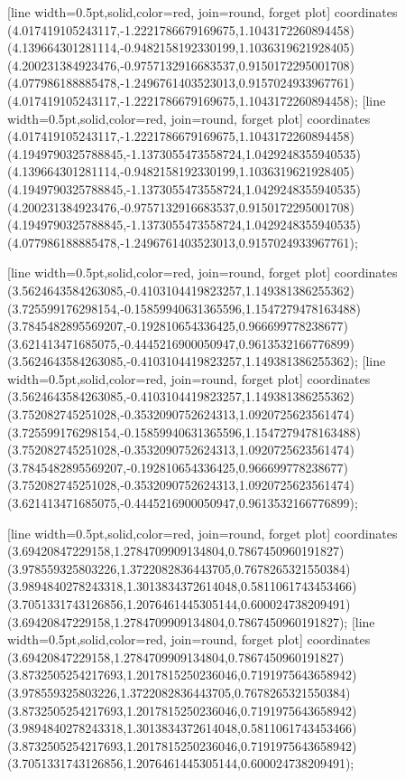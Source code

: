 [line width=0.5pt,solid,color=red, join=round, forget plot] coordinates {(4.017419105243117,-1.2221786679169675,1.1043172260894458) (4.139664301281114,-0.9482158192330199,1.1036319621928405) (4.200231384923476,-0.9757132916683537,0.9150172295001708) (4.077986188885478,-1.2496761403523013,0.9157024933967761) (4.017419105243117,-1.2221786679169675,1.1043172260894458)};
[line width=0.5pt,solid,color=red, join=round, forget plot] coordinates {(4.017419105243117,-1.2221786679169675,1.1043172260894458) (4.1949790325788845,-1.1373055473558724,1.0429248355940535) (4.139664301281114,-0.9482158192330199,1.1036319621928405) (4.1949790325788845,-1.1373055473558724,1.0429248355940535) (4.200231384923476,-0.9757132916683537,0.9150172295001708) (4.1949790325788845,-1.1373055473558724,1.0429248355940535) (4.077986188885478,-1.2496761403523013,0.9157024933967761)};

[line width=0.5pt,solid,color=red, join=round, forget plot] coordinates {(3.5624643584263085,-0.4103104419823257,1.149381386255362) (3.725599176298154,-0.15859940631365596,1.1547279478163488) (3.7845482895569207,-0.192810654336425,0.966699778238677) (3.621413471685075,-0.4445216900050947,0.9613532166776899) (3.5624643584263085,-0.4103104419823257,1.149381386255362)};
[line width=0.5pt,solid,color=red, join=round, forget plot] coordinates {(3.5624643584263085,-0.4103104419823257,1.149381386255362) (3.752082745251028,-0.3532090752624313,1.0920725623561474) (3.725599176298154,-0.15859940631365596,1.1547279478163488) (3.752082745251028,-0.3532090752624313,1.0920725623561474) (3.7845482895569207,-0.192810654336425,0.966699778238677) (3.752082745251028,-0.3532090752624313,1.0920725623561474) (3.621413471685075,-0.4445216900050947,0.9613532166776899)};

[line width=0.5pt,solid,color=red, join=round, forget plot] coordinates {(3.69420847229158,1.2784709909134804,0.7867450960191827) (3.978559325803226,1.3722082836443705,0.7678265321550384) (3.9894840278243318,1.3013834372614048,0.5811061743453466) (3.7051331743126856,1.2076461445305144,0.600024738209491) (3.69420847229158,1.2784709909134804,0.7867450960191827)};
[line width=0.5pt,solid,color=red, join=round, forget plot] coordinates {(3.69420847229158,1.2784709909134804,0.7867450960191827) (3.8732505254217693,1.2017815250236046,0.7191975643658942) (3.978559325803226,1.3722082836443705,0.7678265321550384) (3.8732505254217693,1.2017815250236046,0.7191975643658942) (3.9894840278243318,1.3013834372614048,0.5811061743453466) (3.8732505254217693,1.2017815250236046,0.7191975643658942) (3.7051331743126856,1.2076461445305144,0.600024738209491)};

